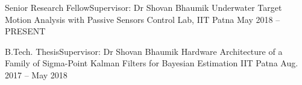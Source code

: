 
\begin{cventries}

\cventry
	{Senior Research Fellow\quad\textbar\quad Supervisor: Dr Shovan Bhaumik} %
	{Underwater Target Motion Analysis with Passive Sensors} %
	{Control Lab, IIT Patna} %
	{May 2018 -- PRESENT} %
	{\begin{cvitems} %
		\item {}
	\end{cvitems}}

\cventry
	{B.Tech. Thesis\quad\textbar\quad Supervisor: Dr Shovan Bhaumik} %
	{Hardware Architecture of a Family of Sigma-Point Kalman Filters for Bayesian Estimation} %
	{IIT Patna} %
	{Aug. 2017 -- May 2018} %
	{\begin{cvitems} %
		\item {}
	\end{cvitems}}

\end{cventries}
